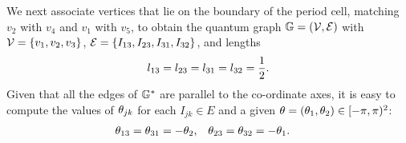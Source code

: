 We next associate vertices that lie on the boundary of the period cell, matching $v_2$ with $v_4$ and $v_1$ with $v_5$, to obtain the quantum graph $\mathbb{G}=\left( \mathcal{V},\mathcal{E} \right)$ with $\mathcal{V}=\left\{ v_1,v_2,v_3 \right\}$, $\mathcal{E}=\left\{ I_{13},I_{23},I_{31},I_{32} \right\}$, and lengths
\begin{align*}
	l_{13} = l_{23} = l_{31} = l_{32} = \frac{1}{2}.
\end{align*}
Given that all the edges of $\mathbb{G}^*$ are parallel to the co-ordinate axes, it is easy to compute the values of $\theta_{jk}$ for each $I_{jk}\in E$ and a given $\theta=\left( \theta_1,\theta_2 \right)\in[-\pi,\pi)^2$:
\begin{align*}
	\theta_{13} = \theta_{31} = -\theta_2, &\quad \theta_{23} = \theta_{32} = -\theta_1.
\end{align*}

